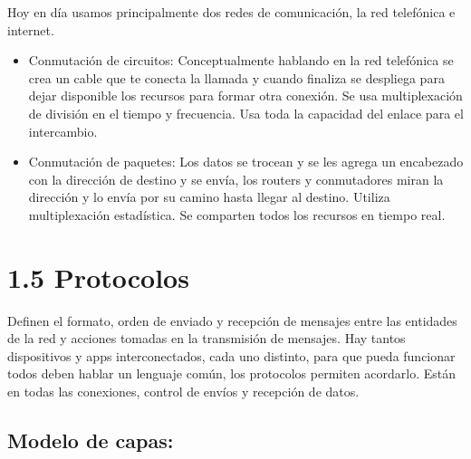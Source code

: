 \documentclass[12pt, twoside, openright]{report} %
\begin{document}
	Hoy en día usamos principalmente dos redes de comunicación, la red
	telefónica e internet.

	\begin{itemize}
	\item
	Conmutación de circuitos: Conceptualmente hablando en la red
	telefónica se crea un cable que te conecta la llamada y cuando
	finaliza se despliega para dejar disponible los recursos para formar
	otra conexión. Se usa multiplexación de división en el tiempo y
	frecuencia. Usa toda la capacidad del enlace para el intercambio.
	\item
	Conmutación de paquetes: Los datos se trocean y se les agrega un
	encabezado con la dirección de destino y se envía, los routers y
	conmutadores miran la dirección y lo envía por su camino hasta llegar
	al destino. Utiliza multiplexación estadística. Se comparten todos los
	recursos en tiempo real.
	\end{itemize}

\section{1.5 Protocolos}

	Definen el formato, orden de enviado y recepción de mensajes entre las
	entidades de la red y acciones tomadas en la transmisión de mensajes.
	Hay tantos dispositivos y apps interconectados, cada uno distinto, para
	que pueda funcionar todos deben hablar un lenguaje común, los protocolos
	permiten acordarlo. Están en todas las conexiones, control de envíos y
	recepción de datos.

\subsection{Modelo de capas:}
\end{document}
